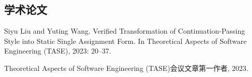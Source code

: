 
\begin{achievements}

\subsection*{学术论文}

\begin{bibliolist}{00}
  \item Siyu Liu and Yuting Wang. Verified Transformation of Continuation-Passing 
    Style into Static Single Assignment Form. 
    In Theoretical Aspects of Software Engineering (TASE), 2023: 20–37. 
\end{bibliolist}

\begin{bibliolist*}{00}
  \item Theoretical Aspects of Software Engineering (TASE)会议文章第一作者, 2023.
\end{bibliolist*}

\end{achievements}
